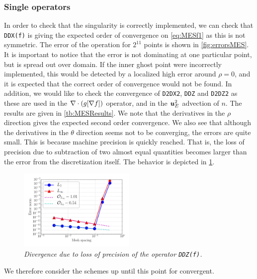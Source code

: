 \subsubsection{Single operators}
\label{sec:singleOp}
%
In order to check that the singularity is correctly implemented, we can check that \texttt{DDX(f)} is giving the expected order of convergence on \cref{eq:MESf1} as this is not symmetric.
The error of the operation for $2^{11}$ points is shown in \cref{fig:errorsMES}.
It is important to notice that the error is not dominating at one particular point, but is spread out over domain.
If the inner ghost point were incorrectly implemented, this would be detected by a localized high error around $\rho=0$, and it is expected that the correct order of convergence would not be found.
In addition, we would like to check the convergence of \texttt{D2DX2}, \texttt{DDZ} and \texttt{D2DZ2} as these are used in the $\nabla\cdot\left(g[\nabla f]\right)$ operator, and in the $\boldsymbol{u}_E^2$ advection of $n$.
The results are given in \cref{tb:MESResults}.
We note that the derivatives in the $\rho$ direction gives the expected second order convergence.
We also see that although the derivatives in the $\theta$ direction seems not to be converging, the errors are quite small.
This is because machine precision is quickly reached.
That is, the loss of precision due to subtraction of two almost equal quantities becomes larger than the error from the discretization itself.
The behavior is depicted in \cref{fig:divDDZ}.
%
\begin{figure}[htb]
    \centering
    \includegraphics[width=0.5\textwidth]{fig/divDDZ}
    \caption{\textit{
            Divergence due to loss of precision of the operator \texttt{DDZ(f)}.
        }}
    \label{fig:divDDZ}
\end{figure}
%
We therefore consider the schemes up until this point for convergent.

